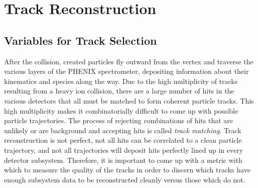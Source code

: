 \section{Track Reconstruction}
\label{trkrecosect}
\subsection{Variables for Track Selection}
After the collision, created particles fly outward from the vertex and traverse the various layers of the PHENIX spectrometer, depositing information about their kinematics and species along the way. Due to the high multiplicity of tracks resulting from a heavy ion collision, there are a large number of hits in the various detectors that all must be matched to form coherent particle tracks. This high multiplicity makes it combinatorially difficult to come up with possible particle trajectories. The process of rejecting combinations of hits that are unlikely or are background and accepting hits is called \textit{track matching}. Track reconstruction is not perfect, not all hits can be correlated to a clean particle trajectory, and not all trajectories will deposit hits perfectly lined up in every detector subsystem. Therefore, it is important to come up with a metric with which to measure the quality of the tracks in order to discern which tracks have enough subsystem data to be reconstructed cleanly versus those which do not.
